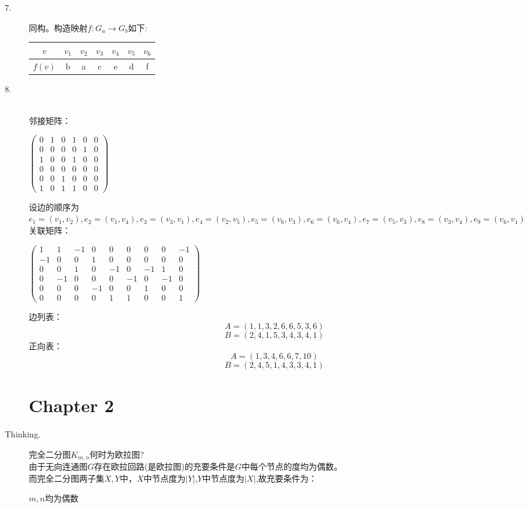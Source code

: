 \documentclass[UTF8, onecolumn, a4paper]{article}
\begin{document}
\begin{description}
\item[7.]
同构。构造映射$f:G_a\rightarrow G_b$如下:
\begin{center}
	\begin{tabular}{ccccccc}
	\hline
		$v$ & $v_1$ & $v_2$ & $v_3$ &  $v_4$ & $v_5$ & $v_6$\\
	\hline
		$f(v)$&b & a& c & e & d & f  \\
	\hline
	\end{tabular}
\end{center}
\item[8.]\quad\\
邻接矩阵：
\begin{center}
$\begin{pmatrix}
	0 & 1 & 0 & 1 & 0 & 0\\
	0 & 0 & 0 & 0 & 1 & 0\\
	1 & 0 & 0 & 1 & 0 & 0\\
	0 & 0 & 0 & 0 & 0 & 0\\
	0 & 0 & 1 & 0 & 0 & 0\\
	1 & 0 & 1 & 1 & 0 & 0
\end{pmatrix}$
\end{center}
设边的顺序为$e_1 = (v_1, v_2), e_2 = (v_1, v_4), e_3 = (v_3, v_1), e_4 = (v_2, v_5), e_5 = (v_6, v_3), e_6 = (v_6, v_4), e_7 = (v_5, v_3), e_8 = (v_3, v_4), e_9 = (v_6, v_1)$\\
关联矩阵：
\begin{center}
$\begin{pmatrix}
1 & 1 & -1 & 0 & 0 & 0 & 0 & 0 & -1\\
-1 & 0 & 0 & 1 & 0 & 0 & 0 & 0 & 0\\
0 & 0 & 1 & 0 & -1 & 0 & -1 & 1 & 0 \\
0 & -1 & 0 & 0 & 0 & -1 & 0 & -1 & 0 \\
0 & 0 & 0 & -1 & 0 & 0 & 1 & 0 & 0\\
0 & 0 & 0 & 0 & 1 & 1 & 0 & 0 & 1
\end{pmatrix}$
\end{center}
边列表：
$$A = (1, 1, 3, 2, 6, 6, 5, 3, 6)$$
$$B = (2, 4, 1, 5, 3, 4, 3, 4 ,1)$$
正向表：
$$A = (1, 3, 4, 6, 6, 7, 10)$$
$$B = (2, 4, 5, 1, 4, 3, 3, 4 ,1)$$

\section*{Chapter 2}
\item[Thinking.]
完全二分图$K_{m, n}$何时为欧拉图?\\
由于无向连通图$G$存在欧拉回路(是欧拉图)的充要条件是$G$中每个节点的度均为偶数。\\
而完全二分图两子集$X, Y$中，$X$中节点度为$|Y|$,$Y$中节点度为$|X|$,故充要条件为：
\begin{center}
	$m, n$均为偶数
\end{center}


\end{description}
\end{document}
